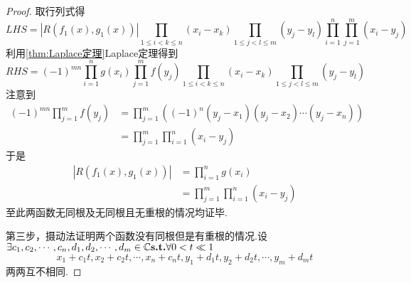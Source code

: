 {\begin{proof}
        取行列式得
        \[
            LHS = \left|
            R \left(
            f_1\left(x\right),g_1\left(x\right)
            \right)
            \right|\prod_{1\leqslant i<k\leqslant n}\left(
            x_i-x_k
            \right)\prod_{1\leqslant j<l\leqslant m}\left(
            y_j-y_l
            \right)
            \prod_{i=1}^{n}\prod_{j=1}^{m}\left(
            x_i-y_j
            \right)
        \]
        利用\cref{thm:Laplace定理}Laplace定理得到
        \[
            RHS=\left(-1\right)^{mn}\prod_{i=1}^{n}
            g\left(x_i\right)\prod_{j=1}^{m}f\left(y_j\right)\prod_{1\leqslant i<k\leqslant n}\left(
            x_i-x_k
            \right)\prod_{1\leqslant j<l\leqslant m}\left(
            y_j-y_l
            \right)
        \]
        注意到
        \begin{align*}
            \left(-1\right)^{mn}\prod_{j=1}^{m}f\left(y_j\right) & =\prod_{j=1}^{m}\left(
            \left(-1\right)^n\left(y_j-x_1\right)\left(y_j-x_2\right)\cdots\left(y_j-x_n\right)
            \right)                                                                                      \\
                                                                 & =\prod_{j=1}^{m}\prod_{i=1}^{n}\left(
            x_i-y_j
            \right)
        \end{align*}
        于是
        \begin{align*}
            \left|
            R\left(f_1\left(x\right),g_1\left(x\right)\right)
            \right| & =\prod_{i=1}^{n}g\left(x_i\right) \\
                    & =
            \prod_{j=1}^{m}\prod_{i=1}^{n}\left(
            x_i-y_j
            \right)
        \end{align*}至此两函数无同根及无同根且无重根的情况均证毕.

        第三步，摄动法证明两个函数没有同根但是有重根的情况.设$\exists c_1,c_2,\cdots,c_n,d_1,d_2,\cdots,d_m\in\mathbb{C}\textup{\bfseries{s.t.}}\forall 0<t\ll 1$\[x_1+c_1t,x_2+c_2t,\cdots,x_n+c_nt,y_1+d_1t,y_2+d_2t,\cdots,y_m+d_mt\]两两互不相同.


\end{proof}}
